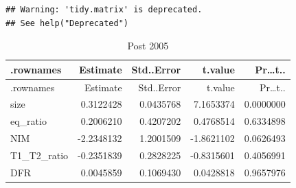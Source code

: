 \documentclass[11pt,]{article}
\begin{document}
\begin{verbatim}
## Warning: 'tidy.matrix' is deprecated.
## See help("Deprecated")
\end{verbatim}

\begin{longtable}[]{@{}lrrrr@{}}
\caption{Post 2005}\tabularnewline
\toprule
.rownames & Estimate & Std..Error & t.value &
Pr\ldots{}t..\tabularnewline
\midrule
\endfirsthead
\toprule
.rownames & Estimate & Std..Error & t.value &
Pr\ldots{}t..\tabularnewline
\midrule
\endhead
size & 0.3122428 & 0.0435768 & 7.1653374 & 0.0000000\tabularnewline
eq\_ratio & 0.2006210 & 0.4207202 & 0.4768514 & 0.6334898\tabularnewline
NIM & -2.2348132 & 1.2001509 & -1.8621102 & 0.0626493\tabularnewline
T1\_T2\_ratio & -0.2351839 & 0.2828225 & -0.8315601 &
0.4056991\tabularnewline
DFR & 0.0045859 & 0.1069430 & 0.0428818 & 0.9657976\tabularnewline
\bottomrule
\end{longtable}
\end{document}
